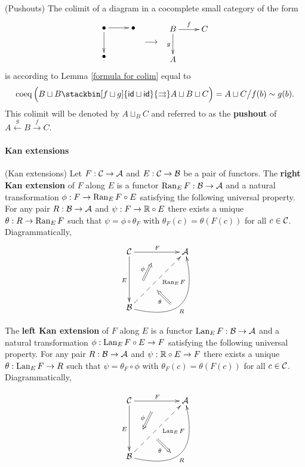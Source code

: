 \documentclass[thesis.tex]{subfiles}
\begin{document}
\begin{example}(Pushouts)
The colimit of a diagram in a cocomplete small category of the form \vspace*{-10pt}
$$\begin{array}{l}
\xymatrix{\bullet\ar[d]\ar[r] & \bullet \\ \bullet &}
\end{array}\longrightarrow\begin{array}{l}
\xymatrix{B\ar[d]_g\ar[r]^f & C\\ A &}
\end{array}$$
is according to Lemma \ref{formula for colim} equal to $$\coeq\Big(B\sqcup B\stackbin[f\sqcup g]{\id\sqcup\id}{\rightrightarrows}A\sqcup B\sqcup C \Big)=A\sqcup C\big/f(b)\sim g(b).$$
This colimit will be denoted by $A\sqcup_B C$ and referred to as the \textbf{pushout} of $A\stackrel{g}{\leftarrow}B\stackrel{f}{\to}C$.
\end{example}

\paragraph{Kan extensions}

\begin{definition} (Kan extensions)
Let $F:\operatorname{\mathcal{C}}\to\operatorname{\mathcal{A}}$ and $E:\operatorname{\mathcal{C}}\to\operatorname{\mathcal{B}}$ be a pair of functors. The \textbf{right Kan extension} of $F$ along $E$ is a functor $\operatorname{Ran}_E F:\operatorname{\mathcal{B}}\to\operatorname{\mathcal{A}}$ and a natural transformation $\phi: F \to\operatorname{Ran}_E F\circ E$ satisfying the following universal property. For any pair $R:\operatorname{\mathcal{B}}\to\operatorname{\mathcal{A}}$ and $\psi:F\to\mathbb{R}\circ E$ there exists a unique $\theta:R\to \operatorname{Ran}_E F$ such that $\psi=\phi\circ\theta_F$ with $\theta_F(c)=\theta(F(c))$ for all $c\in\operatorname{\mathcal{C}}$. Diagrammatically,
$$\xymatrix@C=2pc @R=2pc{ \C \ar[rr]^F \ar[dd]_E & \ar@{}[ldd]^(.15){}="c"^(.55){}="d" \ar_{\phi}@{<=} "c";"d" & \A  \\ & & \\
\B \ar@{-->}[rruu]_(.55){\Ran_E F} \ar@/_3.4pc/[rruu]_(.45){R} & & \ar@{}[lu]^(.25){}="b"^(.90){}="a" \ar_{\theta}@<-2ex>@{<=} "a";"b"}$$

The \textbf{left Kan extension} of $F$ along $E$ is a functor $\operatorname{Lan}_E F:\operatorname{\mathcal{B}}\to\operatorname{\mathcal{A}}$ and a natural transformation $\phi: \operatorname{Lan}_E F\circ E \to F$ satisfying the following universal property. For any pair $R:\operatorname{\mathcal{B}}\to\operatorname{\mathcal{A}}$ and $\psi:\mathbb{R}\circ E\to F$ there exists a unique $\theta:\operatorname{Lan}_E F\to R$ such that $\psi=\theta_F\circ\phi$ with $\theta_F(c)=\theta(F(c))$ for all $c\in\operatorname{\mathcal{C}}$. Diagrammatically,

$$\xymatrix@C=2pc @R=2pc{ \C \ar[rr]^F \ar[dd]_E & \ar@{}[ldd]^(.15){}="c"^(.55){}="d" \ar_{\phi}@{=>} "c";"d" & \A  \\ & & \\
\B \ar@{-->}[rruu]_(.55){\Lan_E F} \ar@/_3.4pc/[rruu]_(.45){R} & & \ar@{}[lu]^(.25){}="b"^(.90){}="a" \ar_{\theta}@<-2ex>@{=>} "a";"b"}$$
\end{definition}
\end{document}
